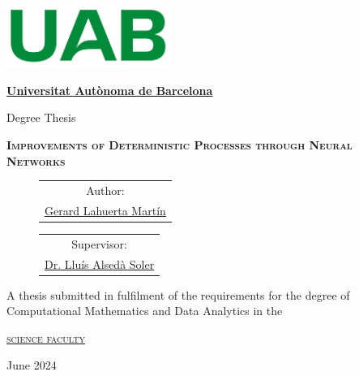 \documentclass[a4paper, 11pt]{article}
\begin{document}
\pagestyle{plain}

\begin{titlepage}
    \centering
    {\includegraphics[width=0.4\textwidth]{PORTADA/UAB.png}\par}
    \vspace{1cm}
    {\bfseries\LARGE \href{https://www.uab.cat/}{Universitat Autònoma de Barcelona} \par}
    \vspace{2cm}
    {\Large Degree Thesis \par}
    \vspace{2em}
    \hline
    \vspace{1cm}
    {\scshape\Huge \textbf{Improvements of Deterministic Processes through Neural Networks} \par}
    \vspace{1cm}
    \hline
    \vspace{2cm}
    {\Large
    \begin{figure}[h]
    \hspace{-6.5em}
        \begin{minipage}{10cm} \centering %
            \begin{tabular}{c}
                Author: \\
                \href{https://github.com/Gerard-Lahuerta}{Gerard Lahuerta Martín}
            \end{tabular}
        \end{minipage}
        \begin{minipage}{10cm} \centering %
            \begin{tabular}{c}
                Supervisor: \\
                \href{https://mat.uab.cat/~alseda/}{Dr. Lluís Alsedà Soler}
            \end{tabular}
        \end{minipage}
    \end{figure}\par}
    \vspace{2cm}
    {\scshape 
        \begin{minipage}{10cm} \centering %
            A thesis submitted in fulfilment of the requirements
            for the degree of Computational Mathematics and Data Analytics in the
        \end{minipage} 
    \par} 
    \vspace{2em}
    {\scshape\Large \href{https://www.uab.cat/ciencies}{science faculty} \par}
    \vfill
    {\Large June 2024 \par}
\end{titlepage}
\end{document}
